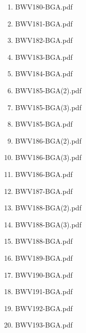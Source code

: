 \documentclass[11pt]{article}
\begin{document}
\begin{enumerate}
\begin{enumerate}
\begin{enumerate}
\item BWV180-BGA.pdf
\label{sec-1-1-1-1-44-6-7-1-202}

\item BWV181-BGA.pdf
\label{sec-1-1-1-1-44-6-7-1-203}

\item BWV182-BGA.pdf
\label{sec-1-1-1-1-44-6-7-1-204}

\item BWV183-BGA.pdf
\label{sec-1-1-1-1-44-6-7-1-205}

\item BWV184-BGA.pdf
\label{sec-1-1-1-1-44-6-7-1-206}

\item BWV185-BGA(2).pdf
\label{sec-1-1-1-1-44-6-7-1-207}

\item BWV185-BGA(3).pdf
\label{sec-1-1-1-1-44-6-7-1-208}

\item BWV185-BGA.pdf
\label{sec-1-1-1-1-44-6-7-1-209}

\item BWV186-BGA(2).pdf
\label{sec-1-1-1-1-44-6-7-1-210}

\item BWV186-BGA(3).pdf
\label{sec-1-1-1-1-44-6-7-1-211}

\item BWV186-BGA.pdf
\label{sec-1-1-1-1-44-6-7-1-212}

\item BWV187-BGA.pdf
\label{sec-1-1-1-1-44-6-7-1-213}

\item BWV188-BGA(2).pdf
\label{sec-1-1-1-1-44-6-7-1-214}

\item BWV188-BGA(3).pdf
\label{sec-1-1-1-1-44-6-7-1-215}

\item BWV188-BGA.pdf
\label{sec-1-1-1-1-44-6-7-1-216}

\item BWV189-BGA.pdf
\label{sec-1-1-1-1-44-6-7-1-217}

\item BWV190-BGA.pdf
\label{sec-1-1-1-1-44-6-7-1-218}

\item BWV191-BGA.pdf
\label{sec-1-1-1-1-44-6-7-1-219}

\item BWV192-BGA.pdf
\label{sec-1-1-1-1-44-6-7-1-220}

\item BWV193-BGA.pdf
\label{sec-1-1-1-1-44-6-7-1-221}


\end{enumerate}
\end{enumerate}
\end{enumerate}
\end{document}
